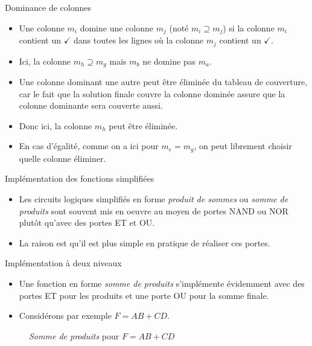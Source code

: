 \documentclass[presentation]{beamer}
\begin{document}
\begin{frame}[label={sec:orgb102631}]{Dominance de colonnes}
\begin{itemize}
\item Une colonne \(m_i\) domine une colonne \(m_j\) (noté \(m_i \supseteq m_j\)) si la colonne \(m_i\) contient un \(\checkmark\) dans toutes les lignes où la colonne \(m_j\) contient un \(\checkmark\).

\item Ici, la colonne \(m_h \supseteq m_g\) mais \(m_b\) ne domine pas \(m_a\).

\item Une colonne \alert{dominant} une autre peut être éliminée du tableau de couverture, car le fait que la solution finale couvre la colonne dominée assure que la colonne dominante sera couverte aussi.

\item Donc ici, la colonne \(m_h\) peut être éliminée.

\item En cas d'égalité, comme on a ici pour \(m_e = m_g\), on peut librement choisir quelle colonne éliminer.
\end{itemize}
\end{frame}

\begin{frame}[label={sec:org2f072d0}]{Implémentation des fonctions simplifiées}
\begin{itemize}
\item Les circuits logiques simplifiés en forme \emph{produit de sommes} ou \emph{somme de produits} sont souvent mis en oeuvre au moyen de portes NAND ou NOR plutôt qu'avec des portes ET et OU.

\item La raison est qu'il est plus simple en pratique de réaliser ces portes.
\end{itemize}
\end{frame}

\begin{frame}[label={sec:orga6163b3}]{Implémentation à deux niveaux}
\begin{itemize}
\item Une fonction en forme \emph{somme de produits} s'implémente évidemment avec des portes ET pour les produits et une porte OU pour la somme finale.

\item Considérons par exemple \(F = AB + CD\).
\end{itemize}

\begin{figure}[htbp]
\centering

\caption{\label{fig:org026dc0a}\emph{Somme de produits} pour \(F = AB + CD\)}
\end{figure} 
\end{frame}
\end{document}
